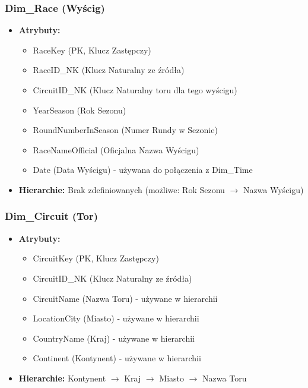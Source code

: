 \documentclass[a4paper,12pt]{article}
\begin{document}
\subsubsection{Dim\_Race (Wyścig)}
\begin{itemize}
  \item \textbf{Atrybuty:}
        \begin{itemize}
          \item RaceKey (PK, Klucz Zastępczy)
          \item RaceID\_NK (Klucz Naturalny ze źródła)
          \item CircuitID\_NK (Klucz Naturalny toru dla tego wyścigu)
          \item YearSeason (Rok Sezonu)
          \item RoundNumberInSeason (Numer Rundy w Sezonie)
          \item RaceNameOfficial (Oficjalna Nazwa Wyścigu)
          \item Date (Data Wyścigu) - używana do połączenia z Dim\_Time
        \end{itemize}
  \item \textbf{Hierarchie:} Brak zdefiniowanych (możliwe: Rok Sezonu $\rightarrow$ Nazwa Wyścigu)
\end{itemize}

\subsubsection{Dim\_Circuit (Tor)}
\begin{itemize}
  \item \textbf{Atrybuty:}
        \begin{itemize}
          \item CircuitKey (PK, Klucz Zastępczy)
          \item CircuitID\_NK (Klucz Naturalny ze źródła)
          \item CircuitName (Nazwa Toru) - używane w hierarchii
          \item LocationCity (Miasto) - używane w hierarchii
          \item CountryName (Kraj) - używane w hierarchii
          \item Continent (Kontynent) - używane w hierarchii
        \end{itemize}
  \item \textbf{Hierarchie:} Kontynent $\rightarrow$ Kraj $\rightarrow$ Miasto $\rightarrow$ Nazwa Toru
\end{itemize}
\end{document}
